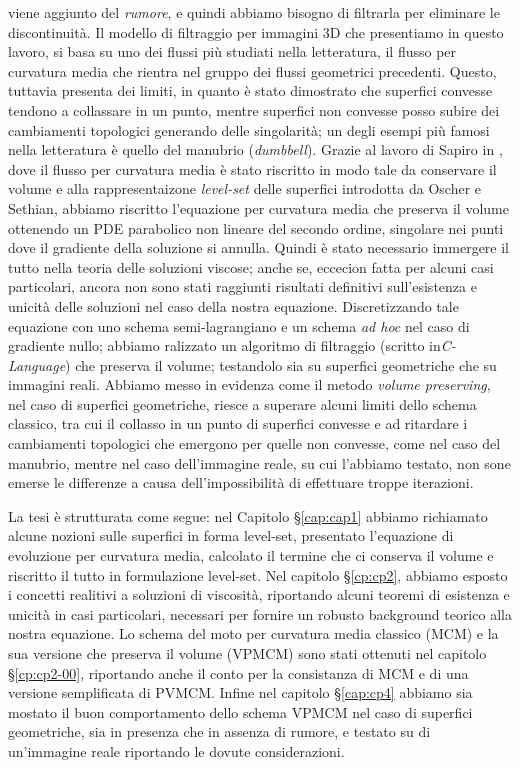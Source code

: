 viene aggiunto del \emph{rumore}, e quindi abbiamo bisogno di
filtrarla per eliminare le discontinuità. Il modello di filtraggio per
immagini 3D che presentiamo in questo lavoro, si basa su uno dei flussi più
studiati nella letteratura, il flusso per curvatura media che rientra
nel gruppo dei flussi geometrici precedenti. Questo, tuttavia presenta
dei limiti, in quanto è stato dimostrato che superfici convesse tendono a
collassare in un punto, mentre superfici non convesse posso subire dei
cambiamenti topologici generando delle singolarità; un degli esempi
più famosi nella letteratura è quello del manubrio (\emph{dumbbell}). 
Grazie al lavoro di Sapiro in \cite[][]{gui:sapiro}, dove il flusso
per curvatura media è stato riscritto in modo tale da conservare il
volume e alla rappresentaizone \emph{level-set} delle superfici
introdotta da Oscher e Sethian, abbiamo riscritto l'equazione per
curvatura media che preserva il volume ottenendo un PDE parabolico non
lineare del secondo ordine, singolare nei punti dove il gradiente della
soluzione si annulla. Quindi è stato necessario immergere il tutto
nella teoria delle soluzioni viscose; anche se, eccecion fatta per
alcuni casi particolari, ancora non sono stati raggiunti risultati
definitivi sull'esistenza e unicità delle soluzioni nel caso della
nostra equazione. Discretizzando tale equazione con uno schema
semi-lagrangiano e un schema \emph{ad hoc} nel caso di gradiente
nullo; abbiamo ralizzato un algoritmo di filtraggio (scritto
in\emph{C-Language}) che preserva il volume; testandolo sia su superfici
geometriche che su immagini reali. Abbiamo messo in evidenza come il metodo
\emph{volume preserving}, nel caso di superfici geometriche, riesce a
superare alcuni limiti dello schema classico, tra cui il collasso in
un punto di superfici convesse e ad ritardare i cambiamenti topologici
che emergono per quelle non convesse, come nel caso del manubrio,
mentre nel caso dell'immagine reale, su cui l'abbiamo testato, non
sone emerse le differenze a causa  dell'impossibilità di effettuare
troppe iterazioni.

La tesi è strutturata come segue: nel Capitolo §\ref{cap:cap1} abbiamo
richiamato alcune nozioni sulle superfici in forma level-set,
presentato l'equazione di evoluzione per curvatura media, calcolato il
termine che ci conserva il volume e riscritto il tutto in formulazione
level-set. Nel capitolo §\ref{cp:cp2}, abbiamo esposto i concetti
realitivi a soluzioni di viscosità, riportando alcuni teoremi di
esistenza e unicità in casi particolari, necessari per fornire un
robusto background teorico alla nostra equazione. Lo schema del moto
per curvatura media classico (MCM) e la sua versione che preserva il
volume (VPMCM) sono stati ottenuti nel capitolo §\ref{cp:cp2-00},
riportando anche il conto per la consistanza di MCM e di una versione
semplificata di PVMCM. Infine nel capitolo §\ref{cap:cp4} abbiamo
sia mostato il buon comportamento dello schema VPMCM nel caso di superfici
geometriche, sia in presenza che in assenza di rumore, e testato su di
un'immagine reale riportando le dovute considerazioni. 
   
